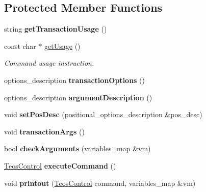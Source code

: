 \subsection*{Protected Member Functions}
\begin{DoxyCompactItemize}
\item 
\mbox{\label{classteos_1_1command_1_1_create_account_options_ae755f847b91be57be448f6ed3a8b8009}} 
string {\bfseries get\+Transaction\+Usage} ()
\item 
const char $\ast$ \mbox{\hyperlink{classteos_1_1command_1_1_create_account_options_af5c13799a676966824e5e9e47b1af180}{get\+Usage}} ()
\begin{DoxyCompactList}\small\item\em Command \textquotesingle{}usage\textquotesingle{} instruction. \end{DoxyCompactList}\item 
\mbox{\label{classteos_1_1command_1_1_create_account_options_aaaa292c801f19000ed073ca752a34ce2}} 
options\+\_\+description {\bfseries transaction\+Options} ()
\item 
\mbox{\label{classteos_1_1command_1_1_create_account_options_aed8f14bd484aaecff46a27f1dd1288cd}} 
options\+\_\+description {\bfseries argument\+Description} ()
\item 
\mbox{\label{classteos_1_1command_1_1_create_account_options_a892d104e8131e44a8420f8aca3a590a3}} 
void {\bfseries set\+Pos\+Desc} (positional\+\_\+options\+\_\+description \&pos\+\_\+desc)
\item 
\mbox{\label{classteos_1_1command_1_1_create_account_options_af5aab64759b629ccdc261f4e3f434a3e}} 
void {\bfseries transaction\+Args} ()
\item 
\mbox{\label{classteos_1_1command_1_1_create_account_options_a481f9c6206512f1afc8bc6729f8dc76b}} 
bool {\bfseries check\+Arguments} (variables\+\_\+map \&vm)
\item 
\mbox{\label{classteos_1_1command_1_1_create_account_options_a60ecaec7f5e305ee8c97844cbcdda197}} 
\mbox{\hyperlink{classteos_1_1_teos_control}{Teos\+Control}} {\bfseries execute\+Command} ()
\item 
\mbox{\label{classteos_1_1command_1_1_create_account_options_a2f4f089db5a69624545292ad2243bc11}} 
void {\bfseries printout} (\mbox{\hyperlink{classteos_1_1_teos_control}{Teos\+Control}} command, variables\+\_\+map \&vm)
\end{DoxyCompactItemize}
